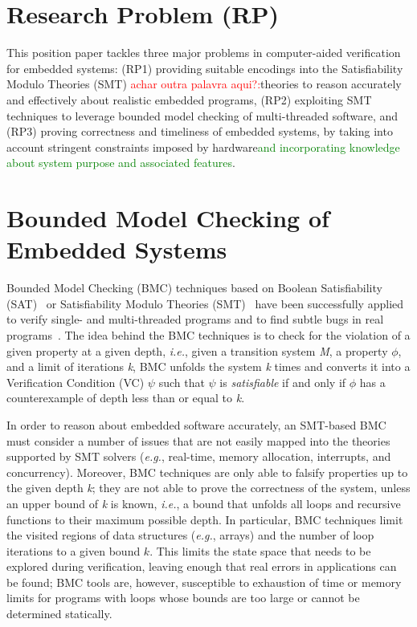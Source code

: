 \documentclass{acm_sen_article}
\begin{document}
\section{Research Problem (RP)}

This position paper tackles three major problems in computer-aided verification for embedded systems: (RP1) providing suitable encodings into the Satisfiability Modulo Theories (SMT) \textcolor{red}{achar outra palavra aqui?:}theories to reason accurately and effectively about realistic embedded programs, (RP2) exploiting SMT techniques to leverage bounded model checking of multi-threaded software, and (RP3) proving correctness and timeliness of embedded systems, by taking into account stringent constraints imposed by hardware\textcolor{green}{and incorporating knowledge about system purpose and associated features}.

\section{Bounded Model Checking of Embedded Systems}

Bounded Model Checking (BMC) techniques based on Boolean Satisfiability (SAT)~\cite{handbook09} or Satisfiability Modulo Theories (SMT)~\cite{BarrettSST09} have been successfully applied to verify single- and multi-threaded programs and to find subtle bugs in real programs~\cite{Clarke04,MerzFS12,CordeiroF11,Ivancic05,Cordeiro12}. The idea behind the BMC techniques is to check for the violation of a given property at a given depth, {\it i.e.}, given a transition system \textit{M}, a property $ \phi $, and a limit of iterations \textit{k}, BMC unfolds the system \textit{k} times and converts it into a Verification Condition (VC) $ \psi $ such that $\psi$ is \textit{satisfiable} if and only if $\phi$ has a counterexample of depth
less than or equal to \textit{k}.

In order to reason about embedded software accurately, an SMT-based BMC must consider a number of issues that are not easily mapped into the theories supported by SMT solvers ({\it e.g.}, real-time, memory allocation, interrupts, and concurrency). Moreover, BMC techniques are only able to falsify properties up to the given depth \textit{k}; they are not able to prove the correctness of the system, unless an upper bound of \textit{k} is known, {\it i.e.}, a bound that unfolds all loops and recursive functions to their maximum possible depth. In particular, BMC techniques limit the visited regions of data structures ({\it e.g.}, arrays) and the number of loop iterations to a given bound $k$. This limits the state space that needs to be explored during verification, leaving enough that real errors in applications \cite{Clarke04,MerzFS12,Ivancic05,Cordeiro12} can be found; BMC tools are, however, susceptible to exhaustion of time or memory limits for programs with loops whose bounds are too large or cannot be determined statically.  
\end{document}

